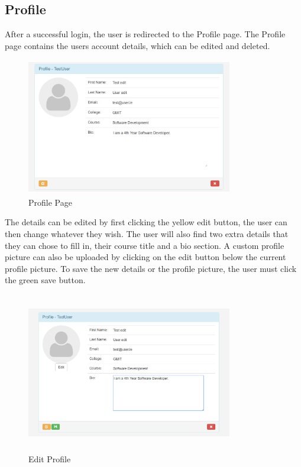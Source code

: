 \subsection{Profile}
After a successful login, the user is redirected to the Profile page. The Profile page contains the users account details, which can be edited and deleted. 

\begin{figure}[h]
\centering
\includegraphics[width=9cm, height=6cm]{img/Profile}
\caption{Profile Page}
\label{fig:Profile}
\end{figure}

The details can be edited by first clicking the yellow edit button, the user can then change whatever they wish. The user will also find two extra details that they can chose to fill in, their course title and a bio section. A custom profile picture can also be uploaded by clicking on the edit button below the current profile picture. To save the new details or the profile picture, the user must click the green save button. 

\begin{figure}[h]
\centering
\includegraphics[width=9cm, height=7cm]{img/ProfileEdit}
\caption{Edit Profile}
\label{fig:ProfileEdit}
\end{figure}

